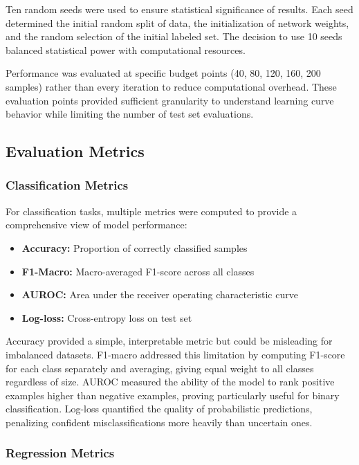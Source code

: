 \documentclass[conference]{IEEEtran}
\begin{document}
Ten random seeds were used to ensure statistical significance of results. Each seed determined the initial random split of data, the initialization of network weights, and the random selection of the initial labeled set. The decision to use 10 seeds balanced statistical power with computational resources.

Performance was evaluated at specific budget points (40, 80, 120, 160, 200 samples) rather than every iteration to reduce computational overhead. These evaluation points provided sufficient granularity to understand learning curve behavior while limiting the number of test set evaluations.

\subsection{Evaluation Metrics}

\subsubsection{Classification Metrics}

For classification tasks, multiple metrics were computed to provide a comprehensive view of model performance:

\begin{itemize}
\item \textbf{Accuracy:} Proportion of correctly classified samples
\item \textbf{F1-Macro:} Macro-averaged F1-score across all classes
\item \textbf{AUROC:} Area under the receiver operating characteristic curve
\item \textbf{Log-loss:} Cross-entropy loss on test set
\end{itemize}

Accuracy provided a simple, interpretable metric but could be misleading for imbalanced datasets. F1-macro addressed this limitation by computing F1-score for each class separately and averaging, giving equal weight to all classes regardless of size. AUROC measured the ability of the model to rank positive examples higher than negative examples, proving particularly useful for binary classification. Log-loss quantified the quality of probabilistic predictions, penalizing confident misclassifications more heavily than uncertain ones.

\subsubsection{Regression Metrics}
\end{document}

